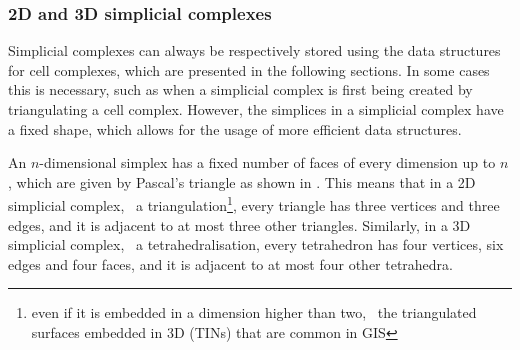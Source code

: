 \subsubsection{2D and 3D simplicial complexes}

Simplicial complexes can always be respectively stored using the data structures for cell complexes, which are presented in the following sections.
In some cases this is necessary, such as when a simplicial complex is first being created by triangulating a cell complex.
However, the simplices in a simplicial complex have a fixed shape, which allows for the usage of more efficient data structures.

An $n$-dimensional simplex has a fixed number of faces of every dimension up to $n$, which are given by Pascal's triangle as shown in .
This means that in a 2D simplicial complex, \ie\ a triangulation\footnote{even if it is embedded in a dimension higher than two, \eg\ the triangulated surfaces embedded in 3D (TINs) that are common in GIS}, every triangle has three vertices and three edges, and it is adjacent to at most three other triangles.
Similarly, in a 3D simplicial complex, \ie\ a tetrahedralisation, every tetrahedron has four vertices, six edges and four faces, and it is adjacent to at most four other tetrahedra.


